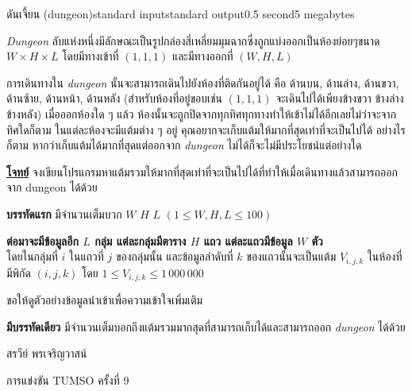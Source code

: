 \documentclass[11pt,a4paper]{article}
\begin{document}
\begin{problem}{ดันเจี้ยน (dungeon)}{standard input}{standard output}{0.5 second}{5 megabytes}

\textit{Dungeon} ลับแห่งหนึ่งมีลักษณะเป็นรูปกล่องสี่เหลี่ยมมุมฉากซึ่งถูกแบ่งออกเป็นห้องย่อยๆขนาด $W \times H \times L$ โดยมีทางเข้าที่ $(1, 1, 1)$ และมีทางออกที่ $(W, H, L)$

การเดินทางใน \textit{dungeon} นั้นจะสามารถเดินไปยังห้องที่ติดกันอยู่ได้ คือ ด้านบน, ด้านล่าง, ด้านขวา, ด้านซ้าย, ด้านหน้า, ด้านหลัง (สำหรับห้องที่อยู่ขอบเช่น $(1, 1, 1)$ จะเดินไปได้เพียงข้างขวา ข้างล่าง ข้างหลัง) เมื่อออกห้องใด ๆ แล้ว ห้องนั้นจะถูกปิดจากทุกทิศทุกทางทำให้เข้าไม่ได้อีกเลยไม่ว่าจะจากทิศใดก็ตาม ในแต่ละห้องจะมีแต้มต่าง ๆ อยู่ คุณอยากจะเก็บแต้มให้มากที่สุดเท่าที่จะเป็นไปได้ อย่างไรก็ตาม หากว่าเก็บแต้มได้มากที่สุดแต่ออกจาก \textit{dungeon} ไม่ได้ก็จะไม่มีประโยชน์แต่อย่างใด



\bigskip
\underline{\textbf{โจทย์}}  จงเขียนโปรแกรมหาแต้มรวมให้มากที่สุดเท่าที่จะเป็นไปได้ที่ทำให้เมื่อเดินทางแล้วสามารถออกจาก dungeon ได้ด้วย


\InputFile

\textbf{บรรทัดแรก} มีจำนวนเต็มบวก $W$ $H$ $L$ $(1 \leq W, H, L \leq 100)$

\textbf{ต่อมาจะมีข้อมูลอีก $L$ กลุ่ม แต่ละกลุ่มมีตาราง $H$ แถว แต่ละแถวมีข้อมูล $W$ ตัว}\\
โดยในกลุ่มที่ $i$ ในแถวที่ $j$ ของกลุ่มนั้น และข้อมูลลำดับที่ $k$ ของแถวนั้นจะเป็นแต้ม $V_{i,j,k}$ ในห้องที่มีพิกัด $(i,j,k)$ โดย $1 \leq V_{i,j,k} \leq 1\,000\,000$ 

ขอให้ดูตัวอย่างข้อมูลนำเข้าเพื่อความเข้าใจเพิ่มเติม

\OutputFile

\textbf{มีบรรทัดเดียว} มีจำนวนเต็มบอกถึงแต้มรวมมากสุดที่สามารถเก็บได้และสามารถออก \textit{dungeon} ได้ด้วย

\Examples

\begin{example}
%
\end{example}


\Source

สรวีย์ พรเจริญวาสน์

การแข่งขัน TUMSO ครั้งที่ 9

\end{problem}
\end{document}
